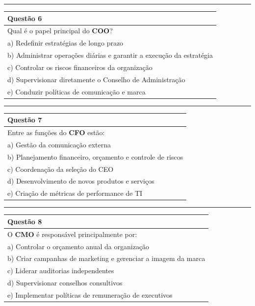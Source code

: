\documentclass[
]{book}
\begin{document}
\begin{center}\rule{0.5\linewidth}{0.5pt}\end{center}

\begin{longtable}[]{@{}l@{}}
\toprule\noalign{}
Questão 6 \\
\midrule\noalign{}
\endhead
\bottomrule\noalign{}
\endlastfoot
Qual é o papel principal do \textbf{COO}? \\
a) Redefinir estratégias de longo prazo \\
b) Administrar operações diárias e garantir a execução da estratégia \\
c) Controlar os riscos financeiros da organização \\
d) Supervisionar diretamente o Conselho de Administração \\
e) Conduzir políticas de comunicação e marca \\
\end{longtable}

\begin{center}\rule{0.5\linewidth}{0.5pt}\end{center}

\begin{longtable}[]{@{}l@{}}
\toprule\noalign{}
Questão 7 \\
\midrule\noalign{}
\endhead
\bottomrule\noalign{}
\endlastfoot
Entre as funções do \textbf{CFO} estão: \\
a) Gestão da comunicação externa \\
b) Planejamento financeiro, orçamento e controle de riscos \\
c) Coordenação da seleção do CEO \\
d) Desenvolvimento de novos produtos e serviços \\
e) Criação de métricas de performance de TI \\
\end{longtable}

\begin{center}\rule{0.5\linewidth}{0.5pt}\end{center}

\begin{longtable}[]{@{}l@{}}
\toprule\noalign{}
Questão 8 \\
\midrule\noalign{}
\endhead
\bottomrule\noalign{}
\endlastfoot
O \textbf{CMO} é responsável principalmente por: \\
a) Controlar o orçamento anual da organização \\
b) Criar campanhas de marketing e gerenciar a imagem da marca \\
c) Liderar auditorias independentes \\
d) Supervisionar conselhos consultivos \\
e) Implementar políticas de remuneração de executivos \\
\end{longtable}
\end{document}

